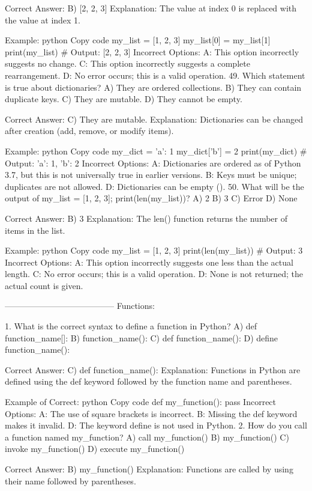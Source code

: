 Correct Answer: B) [2, 2, 3]
Explanation: The value at index 0 is replaced with the value at index 1.

Example:
python
Copy code
my_list = [1, 2, 3]
my_list[0] = my_list[1]
print(my_list)  # Output: [2, 2, 3]
Incorrect Options:
A: This option incorrectly suggests no change.
C: This option incorrectly suggests a complete rearrangement.
D: No error occurs; this is a valid operation.
49. Which statement is true about dictionaries?
A) They are ordered collections.
B) They can contain duplicate keys.
C) They are mutable.
D) They cannot be empty.

Correct Answer: C) They are mutable.
Explanation: Dictionaries can be changed after creation (add, remove, or modify items).

Example:
python
Copy code
my_dict = {'a': 1}
my_dict['b'] = 2
print(my_dict)  # Output: {'a': 1, 'b': 2}
Incorrect Options:
A: Dictionaries are ordered as of Python 3.7, but this is not universally true in earlier versions.
B: Keys must be unique; duplicates are not allowed.
D: Dictionaries can be empty ({}).
50. What will be the output of my_list = [1, 2, 3]; print(len(my_list))?
A) 2
B) 3
C) Error
D) None

Correct Answer: B) 3
Explanation: The len() function returns the number of items in the list.

Example:
python
Copy code
my_list = [1, 2, 3]
print(len(my_list))  # Output: 3
Incorrect Options:
A: This option incorrectly suggests one less than the actual length.
C: No error occurs; this is a valid operation.
D: None is not returned; the actual count is given.

---------------------------------------
Functions:

1. What is the correct syntax to define a function in Python?
A) def function_name[]:
B) function_name():
C) def function_name():
D) define function_name():

Correct Answer: C) def function_name():
Explanation: Functions in Python are defined using the def keyword followed by the function name and parentheses.

Example of Correct:
python
Copy code
def my_function():
    pass
Incorrect Options:
A: The use of square brackets is incorrect.
B: Missing the def keyword makes it invalid.
D: The keyword define is not used in Python.
2. How do you call a function named my_function?
A) call my_function()
B) my_function()
C) invoke my_function()
D) execute my_function()

Correct Answer: B) my_function()
Explanation: Functions are called by using their name followed by parentheses.

